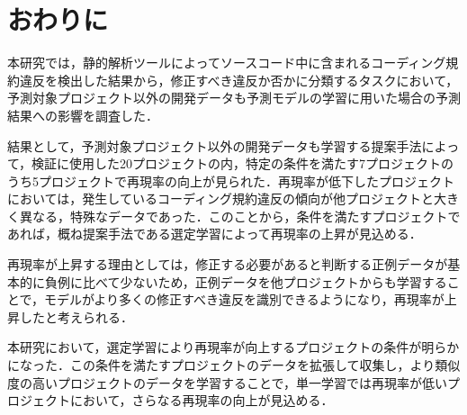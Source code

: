 \documentclass[submit]{ipsj}
\begin{document}
\section{おわりに}\label{chap:end}

本研究では，静的解析ツールによってソースコード中に含まれるコーディング規約違反を検出した結果から，修正すべき違反か否かに分類するタスクにおいて，予測対象プロジェクト以外の開発データも予測モデルの学習に用いた場合の予測結果への影響を調査した．

結果として，予測対象プロジェクト以外の開発データも学習する提案手法によって，検証に使用した20プロジェクトの内，特定の条件を満たす7プロジェクトのうち5プロジェクトで再現率の向上が見られた．再現率が低下したプロジェクトにおいては，発生しているコーディング規約違反の傾向が他プロジェクトと大きく異なる，特殊なデータであった．このことから，条件を満たすプロジェクトであれば，概ね提案手法である選定学習によって再現率の上昇が見込める．

再現率が上昇する理由としては，修正する必要があると判断する正例データが基本的に負例に比べて少ないため，正例データを他プロジェクトからも学習することで，モデルがより多くの修正すべき違反を識別できるようになり，再現率が上昇したと考えられる．

本研究において，選定学習により再現率が向上するプロジェクトの条件が明らかになった．この条件を満たすプロジェクトのデータを拡張して収集し，より類似度の高いプロジェクトのデータを学習することで，単一学習では再現率が低いプロジェクトにおいて，さらなる再現率の向上が見込める．


\begin{biography}
%
\end{biography}



\end{document}
